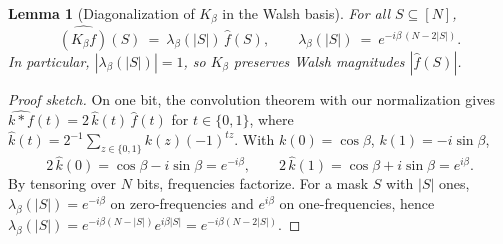 \documentclass[a4paper,onecolumn,11pt,unpublished]{quantumarticle}
\newtheorem{lemma}[theorem]{Lemma}
\theoremstyle{remark}
\begin{document}
\begin{lemma}[Diagonalization of $K_\beta$ in the Walsh basis]
\label{lem:walsh-diag}
For all $S\subseteq[N]$,
\[
  \widehat{(K_\beta f)}(S)\ =\ \lambda_\beta(|S|)\,\widehat{f}(S),
  \qquad
  \lambda_\beta(|S|)\ =\ e^{-i\beta\,(N-2|S|)}.
\]
In particular, $|\lambda_\beta(|S|)|=1$, so $K_\beta$ preserves Walsh magnitudes
$|\widehat{f}(S)|$.
\end{lemma}

\begin{proof}[Proof sketch]
On one bit, the convolution theorem with our normalization gives
$\widehat{k*f}(t)=2\,\widehat{k}(t)\,\widehat{f}(t)$ for $t\in\{0,1\}$, where
$\widehat{k}(t)=2^{-1}\sum_{z\in\{0,1\}}k(z)(-1)^{tz}$.
With $k(0)=\cos\beta$, $k(1)=-i\sin\beta$,
\[
  2\,\widehat{k}(0)=\cos\beta- i\sin\beta=e^{-i\beta},\qquad
  2\,\widehat{k}(1)=\cos\beta+ i\sin\beta=e^{i\beta}.
\]
By tensoring over $N$ bits, frequencies factorize. For a mask $S$ with $|S|$ ones,
$\lambda_\beta(|S|)=e^{-i\beta}$ on zero-frequencies and $e^{i\beta}$ on one-frequencies,
hence $\lambda_\beta(|S|)=e^{-i\beta(N-|S|)}e^{i\beta|S|}=e^{-i\beta(N-2|S|)}$.
\end{proof}

\end{document}
